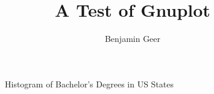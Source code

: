 \documentclass[a4paper]{article}
\title{A Test of Gnuplot}
\author{Benjamin Geer}
\begin{document}
\maketitle

\begin{figure}[h]
\begin{center}

\caption{Histogram of Bachelor's Degrees in US States}
\end{center}
\label{fig:farm}
\end{figure}
\end{document}
